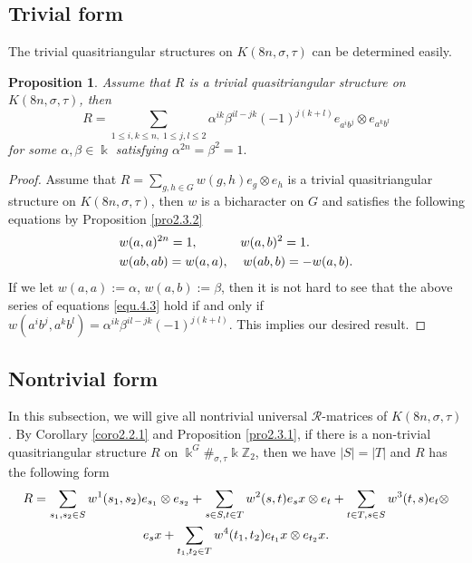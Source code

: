 \documentclass[a4paper,11pt]{amsart}
\numberwithin{equation}{section}
\newtheorem{proposition}[theorem]{Proposition}
\begin{document}
\subsection{Trivial form}\label{sec4.2} The trivial quasitriangular structures on $K(8n,\sigma,\tau)$ can be determined easily.

\begin{proposition}\label{trivial}
Assume that $R$ is a trivial quasitriangular structure on $K(8n,\sigma,\tau)$, then $$R=\sum_{1\leq i,k \leq n,\;1\leq j,l \leq 2}\alpha^{ik}\beta^{il-jk}(-1)^{j(k+l)}e_{a^ib^j} \otimes e_{a^kb^l}$$ for some $\alpha, \beta\in \Bbbk$ satisfying $\alpha^{2n}=\beta^2=1.$
\end{proposition}

\begin{proof}
Assume that $R=\sum_{g,h \in G}w(g,h)e_{g} \otimes e_{h}$ is a trivial quasitriangular structure on $K(8n,\sigma,\tau)$, then $w$ is a bicharacter on $G$ and satisfies the following equations by Proposition \ref{pro2.3.2}
\begin{align}
&w(a,a)^{2n}=1, \;\;\;\;\;\;\;\;\;\;\;\;w(a,b)^2=1.\label{equ.4.3}\\
&w(ab,ab)=w(a,a), \;\;\;\;w(ab,b)=-w(a,b).\notag
\end{align}
If we let $w(a,a):=\alpha$, $w(a,b):=\beta$, then it is not hard to see that the above series of equations \eqref{equ.4.3} hold if and only if $w(a^ib^j,a^kb^l)=\alpha^{ik}\beta^{il-jk}(-1)^{j(k+l)}$. This implies our desired result.
\end{proof}

\subsection{Nontrivial form}\label{sec4.3}
In this subsection, we will give all nontrivial universal $\mathcal{R}$-matrices of $K(8n,\sigma,\tau)$. By Corollary \ref{coro2.2.1} and Proposition \ref{pro2.3.1}, if there is a non-trivial quasitriangular structure $R$ on $\Bbbk^G\#_{\sigma,\tau}\Bbbk \mathbb{Z}_{2}$, then we have $|S|=|T|$ and $R$ has the following form
\begin{gather}
              R=\sum\limits_{s_1,s_2 \in S}w^1(s_1,s_2)e_{s_1} \otimes e_{s_2}+ \sum\limits_{s \in S, t \in T}w^2(s,t)e_{s}x \otimes e_{t}+
        \sum\limits_{t \in T,s \in S}w^3(t,s)e_{t} \otimes \label{r}\\
         e_{s}x+\sum\limits_{t_1,t_2 \in T}w^4(t_1,t_2)e_{t_1}x \otimes e_{t_2}x. \notag
\end{gather}
\end{document}
